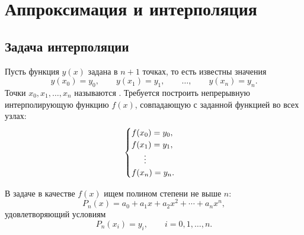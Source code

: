 \documentclass[../final.tex]{subfiles}
\begin{document}
\ifSubfilesClassLoaded{\setcounter{chapter}{3}\setcounter{section}{6}}{}


\chapter{Аппроксимация и интерполяция}


\captionsetup{font=footnotesize,labelfont=bf,skip=5pt}

\section{Задача интерполяции}

Пусть функция $y(x)$ задана в $n+1$ точках, то есть известны значения
%
\begin{equation*}
    y(x_0)=y_0,\qquad y(x_1)=y_1,\qquad\ldots,\qquad y(x_n)=y_n.
\end{equation*}
%
Точки $x_0,x_1,\ldots,x_n$ называются .
Требуется построить непрерывную интерполирующую функцию $f(x)$,
совпадающую с заданной функцией во всех узлах:
%
\begin{equation*}
    \begin{cases}
        f(x_0)=y_0,\\
        f(x_1)=y_1,\\
        \hspace{1.5em}\vdots\\
        f(x_n)=y_n.
    \end{cases}
\end{equation*}

В задаче  в качестве $f(x)$
ищем полином степени не выше $n$:
%
\begin{equation*}
    P_n(x)=a_0+a_1x+a_2x^2+\cdots+a_nx^n,
\end{equation*}
%
удовлетворяющий условиям
%
\begin{equation}
    P_n(x_i)=y_i,\qquad i=0,1,\ldots,n.
    \label{eq:ovf_interpolation_conditions}
\end{equation}
\end{document}
